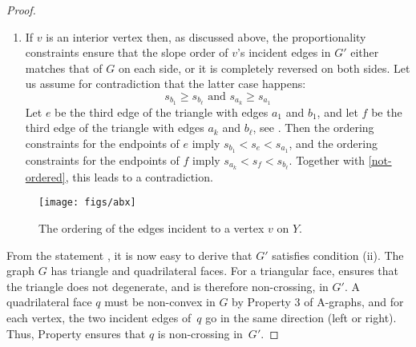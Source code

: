 \begin{proof}
\begin{enumerate}
\begin{enumerate}
\item If $v$ is an interior vertex then,
  as discussed above, the proportionality constraints ensure that the
  slope order of $v$'s incident edges in $G'$ either matches that of
  $G$ on each side, or it is completely reversed on both sides.
  Let us assume for contradiction that the latter case happens:
  \begin{equation}
    \label{eq:not-ordered}
    s_{b_1}\ge s_{b_\ell}
    \text{ and }
    s_{a_k}\ge s_{a_1}
  \end{equation}
  Let $e$ be the third edge of the triangle with edges $a_1$ and
  $b_1$, and let $f$ be the third edge of the triangle with edges
  $a_k$ and $b_\ell$, see .
			Then the ordering constraints for the endpoints of $e$ imply
			\begin{math}
			s_{b_1}<s_e<s_{a_1}
			\end{math},
			and the ordering constraints for the endpoints of $f$ imply
			\begin{math}
			s_{a_k}<s_f<s_{b_\ell}
			\end{math}.
			Together with \eqref{not-ordered}, this leads to a contradiction.
		\end{enumerate}
\end{enumerate}

\begin{figure}
  \centering
  {\texttt{[image: figs/abx]}}
  \caption{The ordering of the edges incident to a vertex $v$ on $Y$.}
\end{figure}


From the statement \thetag{$*$}, it is now easy to derive that
$G'$ satisfies condition (ii).
The graph $G$ has triangle and quadrilateral faces.
%
For a triangular face, \thetag{$*$} ensures that the triangle does not
degenerate, and is therefore non-crossing, in $G'$.
A quadrilateral face $q$ must be non-convex in $G$ by Property 3 of
A-graphs, and for each vertex, the two incident edges of~$q$ go in
the same direction (left or right).
Thus, Property \thetag{$*$} ensures that $q$ is non-crossing in~$G'$.





\end{proof}
